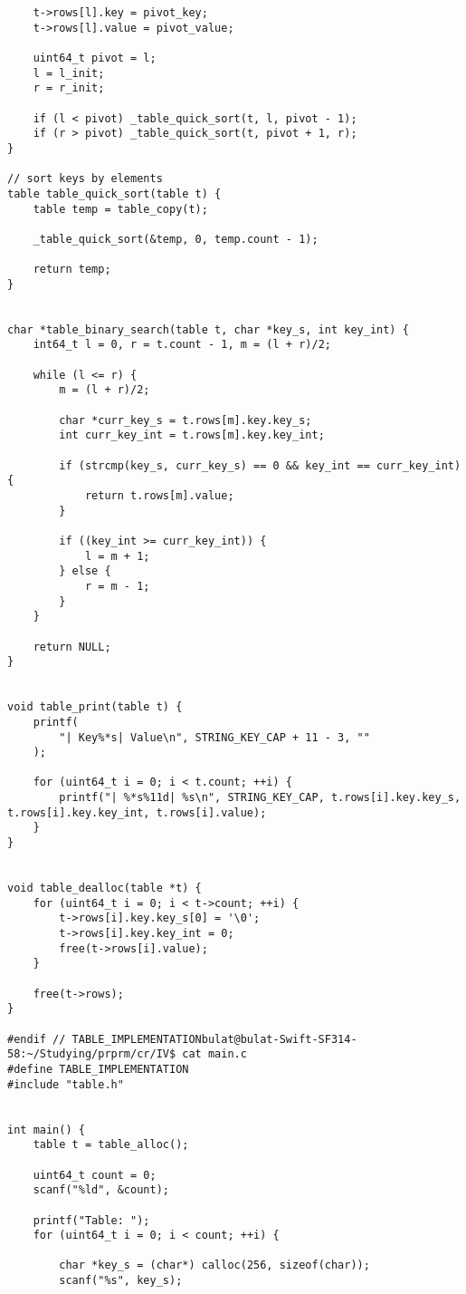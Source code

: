 \documentclass[a4paper]{article}
\newcounter{i}
\begin{document}
\begin{enumerate}[label=\textbf{\arabic*}.]
\begin{verbatim}
    t->rows[l].key = pivot_key;
    t->rows[l].value = pivot_value;

    uint64_t pivot = l;
    l = l_init;
    r = r_init;

    if (l < pivot) _table_quick_sort(t, l, pivot - 1);
    if (r > pivot) _table_quick_sort(t, pivot + 1, r);
}

// sort keys by elements
table table_quick_sort(table t) {
    table temp = table_copy(t);

    _table_quick_sort(&temp, 0, temp.count - 1);

    return temp;
}


char *table_binary_search(table t, char *key_s, int key_int) {
    int64_t l = 0, r = t.count - 1, m = (l + r)/2;

    while (l <= r) {
        m = (l + r)/2;

        char *curr_key_s = t.rows[m].key.key_s;
        int curr_key_int = t.rows[m].key.key_int;

        if (strcmp(key_s, curr_key_s) == 0 && key_int == curr_key_int) {
            return t.rows[m].value;
        }
 
        if ((key_int >= curr_key_int)) {
            l = m + 1;
        } else {
            r = m - 1;
        }
    }

    return NULL;
}


void table_print(table t) {
    printf(
        "| Key%*s| Value\n", STRING_KEY_CAP + 11 - 3, ""
    );

    for (uint64_t i = 0; i < t.count; ++i) {
        printf("| %*s%11d| %s\n", STRING_KEY_CAP, t.rows[i].key.key_s, t.rows[i].key.key_int, t.rows[i].value);
    }
}


void table_dealloc(table *t) {
    for (uint64_t i = 0; i < t->count; ++i) {
        t->rows[i].key.key_s[0] = '\0';
        t->rows[i].key.key_int = 0;
        free(t->rows[i].value);
    }

    free(t->rows);
}

#endif // TABLE_IMPLEMENTATIONbulat@bulat-Swift-SF314-58:~/Studying/prprm/cr/IV$ cat main.c 
#define TABLE_IMPLEMENTATION
#include "table.h"


int main() {
    table t = table_alloc();

    uint64_t count = 0;
    scanf("%ld", &count);
    
    printf("Table: ");
    for (uint64_t i = 0; i < count; ++i) {

        char *key_s = (char*) calloc(256, sizeof(char));
        scanf("%s", key_s);


\end{verbatim}
\end{enumerate}
\end{document}
